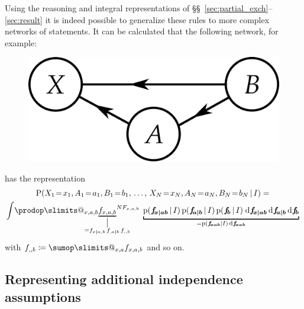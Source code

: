 \documentclass[\ifafour a4paper,12pt,\else a5paper,10pt,\fi%
onecolumn,oneside,article,%
british%
]{memoir}
\makeatletter
\theoremstyle{remark}
\theoremstyle{innote}
\def\sum{\DOTSI\sumop\slimits@}
\def\prod{\DOTSI\prodop\slimits@}
\newcommand*{\di}{\mathrm{d}}%
\newcommand*{\defd}{\coloneqq}
\newcommand*{\pf}{\mathrm{p}}%
\newcommand*{\p}{\mathrm{P}}%
\renewcommand*{\|}[1][]{\nonscript\,#1\vert\nonscript\,\mathopen{}}
\newcommand*{\sects}{\S\S}%
\renewcommand*{\=}{\TextOrMath\texteq\eq}
\newcommand*{\X}[1]{X_{#1}}
\newcommand*{\x}[1]{x_{#1}}
\newcommand*{\A}[1]{A_{#1}}
\newcommand*{\va}[1]{a_{#1}}
\newcommand*{\B}[1]{B_{#1}}
\newcommand*{\vb}[1]{b_{#1}}
\newcommand*{\ff}[1]{f_{#1}}
\newcommand*{\ffb}[1]{\bm{f_{\!#1}}}
\newcommand*{\FF}[1]{F_{#1}}
\newcommand*{\bcond}[1][]{\nonscript\,#1\bm{\vert}\nonscript\;\mathopen{}}
\makeatother
\begin{document}
Using the reasoning and integral representations of
\sects~\ref{sec:partial_exch}--\ref{sec:result} it is indeed possible to
generalize these rules to more complex networks of statements. It can be
calculated that the following network, for example:\\
\begin{figure}[h!]
\centering\includegraphics[scale=0.5]{bayesnet3.png}
\caption{\label{fig:dep3net}}  
\end{figure}%
has the representation
\begin{multline}
  \label{eq:example1}
  \p( \X{1}\=\x{1}, \A{1}\=\va{1}, \B{1}\=\vb{1},\, \dotsc,\,
   \X{N}\=\x{N}, \A{N}\=\va{N}, \B{N}\=\vb{N} \| I) ={}\\
\int\!\prod_{x,a,b} {\underbracket[1pt][0pt]{\ff{x,a,b}}_{\mathclap{%
\begin{gathered}
\scriptstyle\big\vert\\[-2\jot]     
\scriptstyle{}=\ff{x \bcond a,b}\, \ff{,a \bcond b}\, \ff{,,b}
\end{gathered}%
}}}^{N \FF{x,a,b}}\;
\underbracket[1pt]{\pf(\ffb{x \bcond ab}\|I)\,\pf(\ffb{a \bcond b}\|I)\,\pf(\ffb{b}\|I)
  \;\di\ffb{x \bcond ab} \,\di\ffb{a \bcond b} \,\di\ffb{b}}_{{}=
\pf(\ffb{xab}\|I)\,\di\ffb{xab}} \;
\end{multline}
with $\ff{,,b} \defd \sum_{x,a}\ff{x,a,b}$ and so on.

\subsection{Representing additional independence assumptions}
\label{sec:graph_repr_indep}
\end{document}
